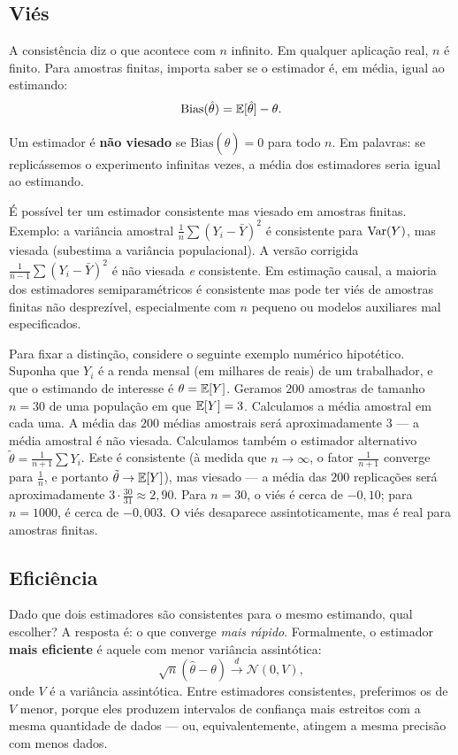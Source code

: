 \subsection*{Viés}

A consistência diz o que acontece com $n$ infinito. Em qualquer aplicação real, $n$ é finito. Para amostras finitas, importa saber se o estimador é, em média, igual ao estimando:
\begin{equation}
\text{Bias}(\hat{\theta}) = \mathbb{E}[\hat{\theta}] - \theta.
\label{eq:vies}
\end{equation}

Um estimador é \textbf{não viesado} se $\text{Bias}(\hat{\theta}) = 0$ para todo $n$. Em palavras: se replicássemos o experimento infinitas vezes, a média dos estimadores seria igual ao estimando.

É possível ter um estimador consistente mas viesado em amostras finitas. Exemplo: a variância amostral $\frac{1}{n} \sum (Y_i - \bar{Y})^2$ é consistente para $\mathrm{Var}(Y)$, mas viesada (subestima a variância populacional). A versão corrigida $\frac{1}{n-1} \sum (Y_i - \bar{Y})^2$ é não viesada \textit{e} consistente. Em estimação causal, a maioria dos estimadores semiparamétricos é consistente mas pode ter viés de amostras finitas não desprezível, especialmente com $n$ pequeno ou modelos auxiliares mal especificados.

Para fixar a distinção, considere o seguinte exemplo numérico hipotético. Suponha que $Y_i$ é a renda mensal (em milhares de reais) de um trabalhador, e que o estimando de interesse é $\theta = \mathbb{E}[Y]$. Geramos $200$ amostras de tamanho $n = 30$ de uma população em que $\mathbb{E}[Y] = 3$. Calculamos a média amostral em cada uma. A média das $200$ médias amostrais será aproximadamente $3$ --- a média amostral é não viesada. Calculamos também o estimador alternativo $\tilde{\theta} = \frac{1}{n+1} \sum Y_i$. Este é consistente (à medida que $n \to \infty$, o fator $\frac{1}{n+1}$ converge para $\frac{1}{n}$, e portanto $\tilde{\theta} \to \mathbb{E}[Y]$), mas viesado --- a média das $200$ replicações será aproximadamente $3 \cdot \frac{30}{31} \approx 2{,}90$. Para $n = 30$, o viés é cerca de $-0{,}10$; para $n = 1000$, é cerca de $-0{,}003$. O viés desaparece assintoticamente, mas é real para amostras finitas.

\subsection*{Eficiência}

Dado que dois estimadores são consistentes para o mesmo estimando, qual escolher? A resposta é: o que converge \textit{mais rápido}. Formalmente, o estimador \textbf{mais eficiente} é aquele com menor variância assintótica:
\[
\sqrt{n}(\hat{\theta} - \theta) \xrightarrow{d} \mathcal{N}(0, V),
\]
onde $V$ é a variância assintótica. Entre estimadores consistentes, preferimos os de $V$ menor, porque eles produzem intervalos de confiança mais estreitos com a mesma quantidade de dados --- ou, equivalentemente, atingem a mesma precisão com menos dados.

